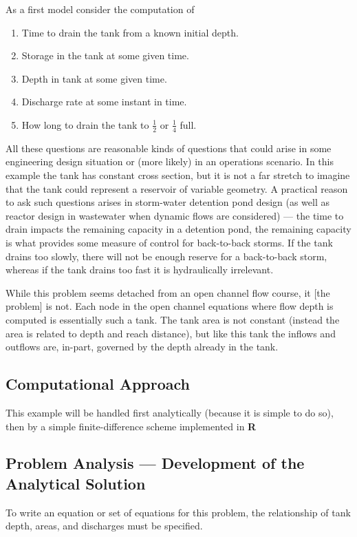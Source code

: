 As a first model consider the computation of 
\begin{enumerate}
\item Time to drain the tank from a known initial depth.
\item Storage in the tank at some given time.
\item Depth in tank at some given time.
\item Discharge rate at some instant in time.
\item How long to drain the tank to $\frac{1}{2}$ or $\frac{1}{4}$ full.
\end{enumerate}

All these questions are reasonable kinds of questions that could arise in some engineering design situation or (more likely) in an operations scenario. In this example the tank has constant cross section, but it is not a far stretch to imagine that the tank could represent a reservoir of variable geometry.  A practical reason to ask such questions arises in storm-water detention pond design (as well as reactor design in wastewater when dynamic flows are considered) --- the time to drain impacts the remaining capacity in a detention pond, the remaining capacity is what provides some measure of control for back-to-back storms.  If the tank drains too slowly, there will not be enough reserve for a back-to-back storm, whereas if the tank drains too fast it is hydraulically irrelevant.

While this problem seems detached from an open channel flow course, it [the problem] is not.  Each node in the open channel equations where flow depth is computed is essentially such a tank.  The tank area is not constant (instead the area is related to depth and reach distance), but like this tank the inflows and outflows are, in-part, governed by the depth already in the tank.


\subsection{Computational Approach}
This example will be handled first analytically (because it is simple to do so), then by a simple finite-difference scheme implemented in \textbf{R}

\subsection{Problem Analysis --- Development of the Analytical Solution}
To write an equation or set of equations for this problem, the relationship of tank depth, areas, and discharges must be specified.

